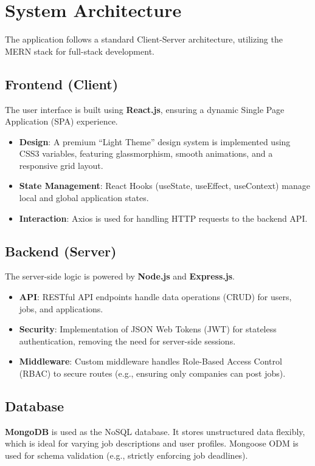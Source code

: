 \documentclass[conference]{IEEEtran}
\begin{document}
\section{System Architecture}
The application follows a standard Client-Server architecture, utilizing the MERN stack for full-stack development.

\subsection{Frontend (Client)}
The user interface is built using \textbf{React.js}, ensuring a dynamic Single Page Application (SPA) experience.
\begin{itemize}
    \item \textbf{Design}: A premium ``Light Theme'' design system is implemented using CSS3 variables, featuring glassmorphism, smooth animations, and a responsive grid layout.
    \item \textbf{State Management}: React Hooks (useState, useEffect, useContext) manage local and global application states.
    \item \textbf{Interaction}: Axios is used for handling HTTP requests to the backend API.
\end{itemize}

\subsection{Backend (Server)}
The server-side logic is powered by \textbf{Node.js} and \textbf{Express.js}.
\begin{itemize}
    \item \textbf{API}: RESTful API endpoints handle data operations (CRUD) for users, jobs, and applications.
    \item \textbf{Security}: Implementation of JSON Web Tokens (JWT) for stateless authentication, removing the need for server-side sessions.
    \item \textbf{Middleware}: Custom middleware handles Role-Based Access Control (RBAC) to secure routes (e.g., ensuring only companies can post jobs).
\end{itemize}

\subsection{Database}
\textbf{MongoDB} is used as the NoSQL database. It stores unstructured data flexibly, which is ideal for varying job descriptions and user profiles. Mongoose ODM is used for schema validation (e.g., strictly enforcing job deadlines).
\end{document}
